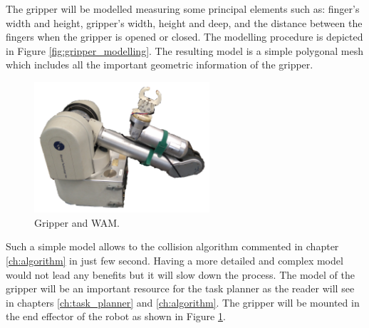 The gripper will be modelled measuring some principal elements such as: finger's width and height, gripper's width, height and deep, and the distance between the fingers when the gripper is opened or closed. The modelling procedure is depicted in Figure \ref{fig:gripper_modelling}. The resulting model is a simple polygonal mesh which includes all the important geometric information of the gripper.
\begin{figure}
\caption{Gripper and WAM.}\label{fig:wam_gripper}
\includegraphics[width=6.5cm]{Img/set_up/wam_gripper.png}
\end{figure}
Such a simple model allows to the collision algorithm commented in chapter \ref{ch:algorithm} in just few second. 
Having a more detailed and complex model would not lead any benefits but it will slow down the process. The model of the gripper will be an important resource for the task planner as the reader will see in chapters \ref{ch:task_planner} and \ref{ch:algorithm}.
The gripper will be mounted in the end effector of the robot as shown in Figure \ref{fig:wam_gripper}. 


